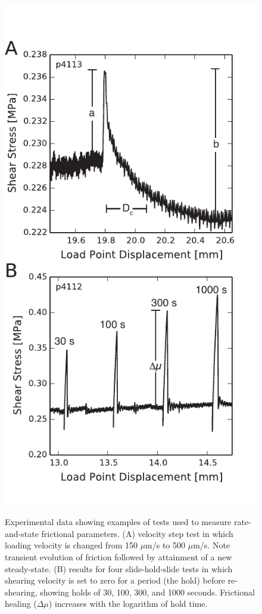 \begin{figure}[t!]
\begin{centering}
\includegraphics{chap_granular_stiffness/Fig1.pdf}
\label{fig:tests}
\caption{Experimental data showing examples of tests used to measure rate-and-state frictional parameters. (A) velocity step test in which loading velocity is changed from 150 $\mu$m/s to 500 $\mu$m/s. Note transient evolution of friction followed by attainment of a new steady-state. (B) results for four slide-hold-slide tests in which shearing velocity is set to zero for a period (the hold) before re-shearing, showing holds of 30, 100, 300, and 1000 seconds. Frictional healing ($\Delta \mu$) increases with the logarithm of hold time.}
\end{centering}
\end{figure}

